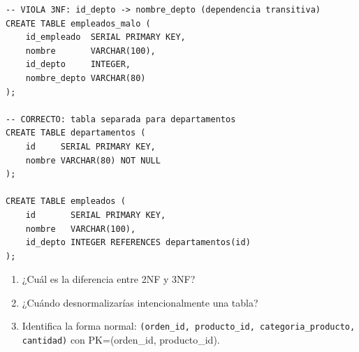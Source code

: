 \begin{lstlisting}[caption={Tabla que viola 3NF y su corrección}]
-- VIOLA 3NF: id_depto -> nombre_depto (dependencia transitiva)
CREATE TABLE empleados_malo (
    id_empleado  SERIAL PRIMARY KEY,
    nombre       VARCHAR(100),
    id_depto     INTEGER,
    nombre_depto VARCHAR(80)
);

-- CORRECTO: tabla separada para departamentos
CREATE TABLE departamentos (
    id     SERIAL PRIMARY KEY,
    nombre VARCHAR(80) NOT NULL
);

CREATE TABLE empleados (
    id       SERIAL PRIMARY KEY,
    nombre   VARCHAR(100),
    id_depto INTEGER REFERENCES departamentos(id)
);
\end{lstlisting}

\begin{entrevistabox}
\begin{enumerate}
  \item ¿Cuál es la diferencia entre 2NF y 3NF?
  \item ¿Cuándo desnormalizarías intencionalmente una tabla?
  \item Identifica la forma normal: \texttt{(orden\_id, producto\_id, categoria\_producto, cantidad)} con PK=(orden\_id, producto\_id).
\end{enumerate}
\end{entrevistabox}
